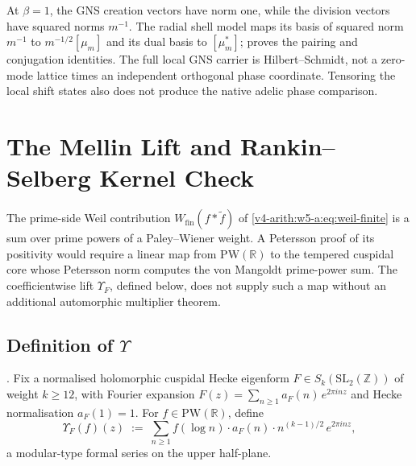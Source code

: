 \begin{remark}
\label{v4-arith:w5-a:rem:restricted-tensor}
At $\beta=1$, the GNS creation vectors have norm one, while
the division vectors have squared norms $m^{-1}$. The radial
shell model maps its basis of squared norm $m^{-1}$ to
$m^{-1/2}[\mu_m]$ and its dual basis to $[\mu_m^*]$;
 proves the pairing
and conjugation identities. The full local GNS carrier is
Hilbert--Schmidt, not a zero-mode lattice times an independent
orthogonal phase coordinate. Tensoring the local shift states
also does not produce the native adelic phase comparison.
\end{remark}

\section{The Mellin Lift and Rankin--Selberg Kernel Check}
\label{v4-arith:w5-a:mellin-lift}

The prime-side Weil contribution \(W_{\mathrm{fin}}(f*\widetilde{f})\) of
\eqref{v4-arith:w5-a:eq:weil-finite} is a sum over prime powers of a
Paley--Wiener weight. A Petersson proof of its positivity would require
a linear map from \(\mathrm{PW}(\mathbb{R})\) to the tempered cuspidal
core whose Petersson norm computes the von Mangoldt prime-power sum.
The coefficientwise lift \(\Upsilon_F\), defined below, does not supply
such a map without an additional automorphic multiplier theorem.

\subsection{Definition of \(\Upsilon\)}
\label{v4-arith:w5-a:mellin-lift:def}

\begin{definition}
\label{v4-arith:w5-a:def:upsilon}
\ClaimStatusDefinitional. Fix a normalised holomorphic cuspidal
Hecke eigenform \(F\in S_{k}(\mathrm{SL}_{2}(\mathbb{Z}))\) of weight
\(k\geq 12\), with Fourier expansion
\(F(z)=\sum_{n\geq 1}a_{F}(n)\,e^{2\pi inz}\) and Hecke normalisation
\(a_{F}(1)=1\). For \(f\in\mathrm{PW}(\mathbb{R})\), define
\begin{equation}
\label{v4-arith:w5-a:eq:upsilon}
\Upsilon_{F}(f)(z)\;:=\;\sum_{n\geq 1}f(\log n)\cdot a_{F}(n)\cdot n^{(k-1)/2}\,e^{2\pi inz},
\end{equation}
a modular-type formal series on the upper half-plane.
\end{definition}

